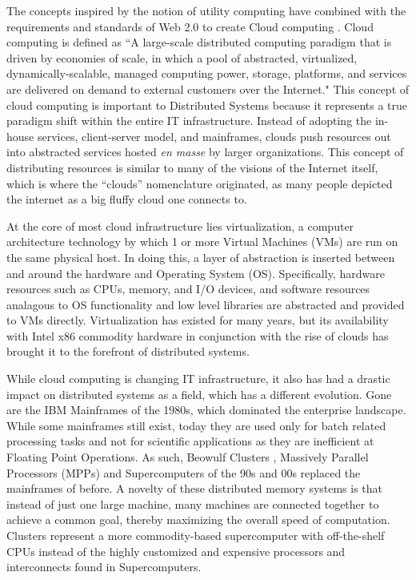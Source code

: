 The concepts inspired by the notion of utility computing have combined with the requirements and standards of Web 2.0 \cite{alexander2006wnw} to create Cloud computing \cite{buyya2008moc, foster2008cca, aboveTheClouds}.  Cloud computing is defined as ``A large-scale distributed computing paradigm that is driven by economies of scale, in which a pool of abstracted, virtualized, dynamically-scalable, managed computing power, storage, platforms, and services are delivered on demand to external customers over the Internet." This concept of cloud computing is important to Distributed Systems because it represents a true paradigm shift \cite{kuhn1970structure} within the entire IT infrastructure.  Instead of adopting the in-house services, client-server model, and mainframes, clouds push resources out into abstracted services hosted \textit{en masse} by larger organizations.  This concept of distributing resources is similar to many of the visions of the Internet itself, which is where the ``clouds'' nomenclature originated, as many people depicted the internet as a big fluffy cloud one connects to.

At the core of most cloud infrastructure lies virtualization, a computer architecture technology by which 1 or more Virtual Machines (VMs) are run on the same physical host. In doing this, a layer of abstraction is inserted between and around the hardware and Operating System (OS). Specifically, hardware resources such as CPUs, memory, and I/O devices, and software resources analagous to OS functionality and low level libraries are abstracted and provided to VMs directly. Virtualization has existed for many years, but its availability with Intel x86 commodity hardware in conjunction with the rise of clouds has brought it to the forefront of distributed systems. 

While cloud computing is changing IT infrastructure, it also has had a drastic impact on distributed systems as a field,  which has a different evolution. Gone are the IBM Mainframes of the 1980s, which dominated the enterprise landscape.  While some mainframes still exist, today they are used only for batch related processing tasks and not for scientific applications as they are inefficient at Floating Point Operations.  As such, Beowulf Clusters \cite{sterling2001beowulf}, Massively Parallel Processors (MPPs) and Supercomputers of the 90s and 00s replaced the mainframes of before. A novelty of these distributed memory systems is that instead of just one large machine, many machines are connected together to achieve a common goal, thereby maximizing the overall speed of computation.  Clusters represent a more commodity-based supercomputer with off-the-shelf CPUs instead of the highly customized and expensive processors and interconnects found in Supercomputers.  

